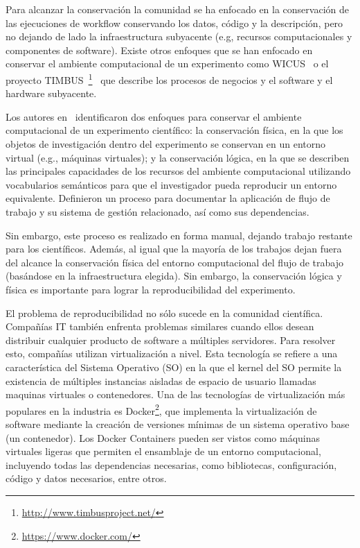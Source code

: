 Para alcanzar la conservación la comunidad se ha enfocado en la conservación de las ejecuciones de workflow conservando los datos, código y la descripción,  pero no dejando de lado la infraestructura subyacente (e.g, recursos computacionales y componentes de software).
Existe otros enfoques que se han enfocado en conservar el ambiente computacional de un experimento como WICUS~\cite{santana2017reproducibility} o el proyecto TIMBUS~\footnote{\url{http://www.timbusproject.net/}}~\cite{dappert2013describing} que describe los procesos de negocios y el software y el hardware subyacente.


Los autores en~\cite{santana2017reproducibility} identificaron dos enfoques para conservar el ambiente computacional de un experimento científico: la conservación física, en la que los objetos de investigación dentro del experimento se conservan en un entorno virtual (e.g., máquinas virtuales); y la conservación lógica, en la que se describen las principales capacidades de los recursos del ambiente computacional utilizando vocabularios semánticos para que el investigador pueda reproducir un entorno equivalente. Definieron un proceso para documentar la aplicación de flujo de trabajo y su sistema de gestión relacionado, así como sus dependencias. 

Sin embargo, este proceso es realizado en forma manual, dejando trabajo restante para los científicos. Además, al igual que la mayoría de los trabajos dejan fuera del alcance la conservación física del entorno computacional del flujo de trabajo (basándose en la infraestructura elegida). Sin embargo, la conservación lógica y física es importante para lograr la reproducibilidad del experimento. 

El problema de reproducibilidad no sólo sucede en la comunidad científica. Compañías IT también enfrenta problemas similares cuando ellos desean distribuir cualquier producto de software a múltiples servidores.
Para resolver esto, compañías utilizan virtualización a nivel. Esta tecnología se refiere a una característica del Sistema Operativo (SO) en la que el kernel del SO permite la existencia de múltiples instancias aisladas de espacio de usuario llamadas maquinas virtuales o contenedores. 
Una de las tecnologías de virtualización más populares en la industria es Docker\footnote{\url{https://www.docker.com/}}, que implementa la virtualización de software mediante la creación de versiones mínimas de un sistema operativo base (un contenedor).
Los Docker Containers pueden ser vistos como máquinas virtuales ligeras que permiten el ensamblaje de un entorno computacional, incluyendo todas las dependencias necesarias, como bibliotecas, configuración, código y datos necesarios, entre otros. 


